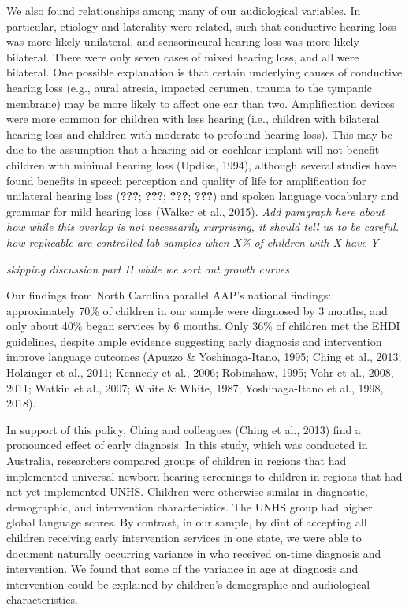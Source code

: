 \documentclass[english,man]{apa6}
\begin{document}
We also found relationships among many of our audiological variables. In particular, etiology and laterality were related, such that conductive hearing loss was more likely unilateral, and sensorineural hearing loss was more likely bilateral. There were only seven cases of mixed hearing loss, and all were bilateral. One possible explanation is that certain underlying causes of conductive hearing loss (e.g., aural atresia, impacted cerumen, trauma to the tympanic membrane) may be more likely to affect one ear than two.
Amplification devices were more common for children with less hearing (i.e., children with bilateral hearing loss and children with moderate to profound hearing loss). This may be due to the assumption that a hearing aid or cochlear implant will not benefit children with minimal hearing loss (Updike, 1994), although several studies have found benefits in speech perception and quality of life for amplification for unilateral hearing loss ({\textbf{???}}; {\textbf{???}}; {\textbf{???}}; {\textbf{???}}) and spoken language vocabulary and grammar for mild hearing loss (Walker et al., 2015).
\emph{Add paragraph here about how while this overlap is not necessarily surprising, it should tell us to be careful. how replicable are controlled lab samples when X\% of children with X have Y}

\emph{skipping discussion part II while we sort out growth curves}

Our findings from North Carolina parallel AAP's national findings: approximately 70\% of children in our sample were diagnosed by 3 months, and only about 40\% began services by 6 months. Only 36\% of children met the EHDI guidelines, despite ample evidence suggesting early diagnosis and intervention improve language outcomes (Apuzzo \& Yoshinaga-Itano, 1995; Ching et al., 2013; Holzinger et al., 2011; Kennedy et al., 2006; Robinshaw, 1995; Vohr et al., 2008, 2011; Watkin et al., 2007; White \& White, 1987; Yoshinaga-Itano et al., 1998, 2018).

In support of this policy, Ching and colleagues (Ching et al., 2013) find a pronounced effect of early diagnosis. In this study, which was conducted in Australia, researchers compared groups of children in regions that had implemented universal newborn hearing screenings to children in regions that had not yet implemented UNHS. Children were otherwise similar in diagnostic, demographic, and intervention characteristics. The UNHS group had higher global language scores. By contrast, in our sample, by dint of accepting all children receiving early intervention services in one state, we were able to document naturally occurring variance in who received on-time diagnosis and intervention. We found that some of the variance in age at diagnosis and intervention could be explained by children's demographic and audiological characteristics.
\end{document}
